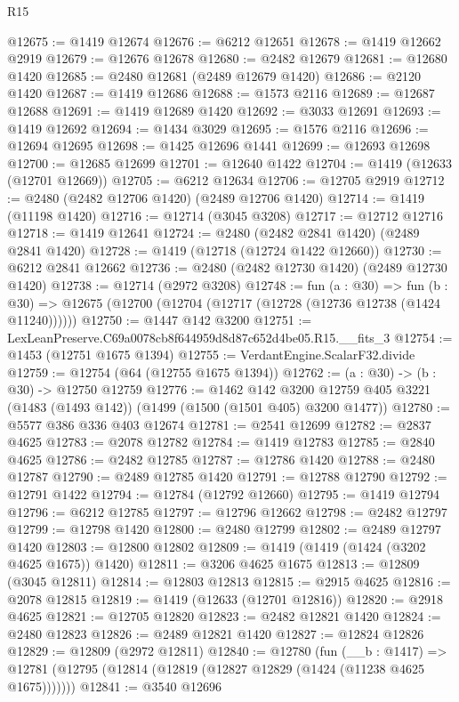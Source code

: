 \begin{lexlean}{R15}
\begin{coremodule}
@12675 := @1419 @12674
@12676 := @6212 @12651
@12678 := @1419 @12662 @2919
@12679 := @12676 @12678
@12680 := @2482 @12679
@12681 := @12680 @1420
@12685 := @2480 @12681 (@2489 @12679 @1420)
@12686 := @2120 @1420
@12687 := @1419 @12686
@12688 := @1573 @2116
@12689 := @12687 @12688
@12691 := @1419 @12689 @1420
@12692 := @3033 @12691
@12693 := @1419 @12692
@12694 := @1434 @3029
@12695 := @1576 @2116
@12696 := @12694 @12695
@12698 := @1425 @12696 @1441
@12699 := @12693 @12698
@12700 := @12685 @12699
@12701 := @12640 @1422
@12704 := @1419 (@12633 (@12701 @12669))
@12705 := @6212 @12634
@12706 := @12705 @2919
@12712 := @2480 (@2482 @12706 @1420) (@2489 @12706 @1420)
@12714 := @1419 (@11198 @1420)
@12716 := @12714 (@3045 @3208)
@12717 := @12712 @12716
@12718 := @1419 @12641
@12724 := @2480 (@2482 @2841 @1420) (@2489 @2841 @1420)
@12728 := @1419 (@12718 (@12724 @1422 @12660))
@12730 := @6212 @2841 @12662
@12736 := @2480 (@2482 @12730 @1420) (@2489 @12730 @1420)
@12738 := @12714 (@2972 @3208)
@12748 := fun (a : @30) =>
  fun (b : @30) => @12675 (@12700 (@12704 (@12717 (@12728 (@12736 @12738 (@1424 @11240))))))
@12750 := @1447 @142 @3200
@12751 := LexLeanPreserve.C69a0078cb8f644959d8d87c652d4be05.R15.__fits_3
@12754 := @1453 (@12751 @1675 @1394)
@12755 := VerdantEngine.ScalarF32.divide
@12759 := @12754 (@64 (@12755 @1675 @1394))
@12762 := (a : @30) -> (b : @30) -> @12750 @12759
@12776 := @1462
    @142
    @3200
    @12759
    @405
    @3221
    (@1483 (@1493 @142))
    (@1499 (@1500 (@1501 @405) @3200 @1477))
@12780 := @5577 @386 @336 @403 @12674
@12781 := @2541 @12699
@12782 := @2837 @4625
@12783 := @2078 @12782
@12784 := @1419 @12783
@12785 := @2840 @4625
@12786 := @2482 @12785
@12787 := @12786 @1420
@12788 := @2480 @12787
@12790 := @2489 @12785 @1420
@12791 := @12788 @12790
@12792 := @12791 @1422
@12794 := @12784 (@12792 @12660)
@12795 := @1419 @12794
@12796 := @6212 @12785
@12797 := @12796 @12662
@12798 := @2482 @12797
@12799 := @12798 @1420
@12800 := @2480 @12799
@12802 := @2489 @12797 @1420
@12803 := @12800 @12802
@12809 := @1419 (@1419 (@1424 (@3202 @4625 @1675)) @1420)
@12811 := @3206 @4625 @1675
@12813 := @12809 (@3045 @12811)
@12814 := @12803 @12813
@12815 := @2915 @4625
@12816 := @2078 @12815
@12819 := @1419 (@12633 (@12701 @12816))
@12820 := @2918 @4625
@12821 := @12705 @12820
@12823 := @2482 @12821 @1420
@12824 := @2480 @12823
@12826 := @2489 @12821 @1420
@12827 := @12824 @12826
@12829 := @12809 (@2972 @12811)
@12840 := @12780
    (fun (__b : @1417) =>
    @12781 (@12795 (@12814 (@12819 (@12827 @12829 (@1424 (@11238 @4625 @1675)))))))
@12841 := @3540 @12696

\end{coremodule}
\end{lexlean}
